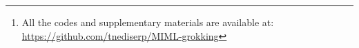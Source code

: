 \begin{abstract}
    Grokking, a phenomenon that the generalization of a neural network happens much later than the convergence of its training loss, has received increasing attention from both learning theory and application since it was first introduced by [Power et al., 2022].
    In this project, we reproduce the grokking phenomenon for modular addition problem, and provide an explanation based on [Kumar et al., ICLR 2024].
    \footnote{All the codes and supplementary materials are available at: \url{https://github.com/tnediserp/MIML-grokking}}
\end{abstract}